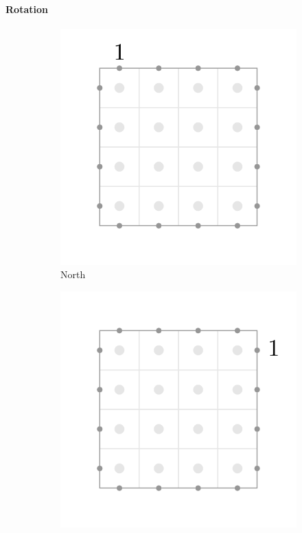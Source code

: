 \documentclass[12pt]{article}
\begin{document}
\paragraph{Rotation}
\begin{figure}[H]
    \centering
    \begin{subfigure}[b]{0.30\textwidth}
        \includegraphics[width=\textwidth]{images/north1.pdf}
        \caption{North}
    \end{subfigure}
    \begin{subfigure}[b]{0.30\textwidth}
        \includegraphics[width=\textwidth]{images/east1.pdf}

\end{subfigure}
\end{figure}
\end{document}
